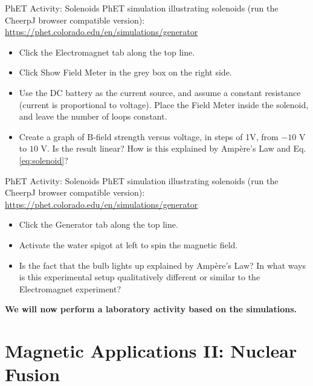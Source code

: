 \documentclass{beamer}
\begin{document}
\begin{frame}{PhET Activity: Solenoids}
PhET simulation illustrating solenoids (\alert{run the CheerpJ browser compatible version}): \\ \vspace{0.5cm}
\small
\url{https://phet.colorado.edu/en/simulations/generator}
\begin{itemize}
\item Click the Electromagnet tab along the top line.
\item Click Show Field Meter in the grey box on the right side.
\item Use the DC battery as the current source, and assume a constant resistance (current is proportional to voltage).  Place the Field Meter inside the solenoid, and leave the number of loops constant.
\item Create a graph of B-field strength versus voltage, in steps of 1V, from $-10$ V to $10$ V.  Is the result linear?  How is this explained by Amp\`{e}re's Law and Eq. \ref{eq:solenoid}?
\end{itemize}
\end{frame}

\begin{frame}{PhET Activity: Solenoids}
PhET simulation illustrating solenoids (\alert{run the CheerpJ browser compatible version}): \\ \vspace{0.5cm}
\small
\url{https://phet.colorado.edu/en/simulations/generator}
\begin{itemize}
\item Click the Generator tab along the top line.
\item Activate the water spigot at left to spin the magnetic field.
\item Is the fact that the bulb lights up explained by Amp\`{e}re's Law?  In what ways is this experimental setup qualitatively different or similar to the Electromagnet experiment?
\end{itemize}
\textbf{We will now perform a laboratory activity based on the simulations.}
\end{frame}


\section{Magnetic Applications II: Nuclear Fusion}
\end{document}
